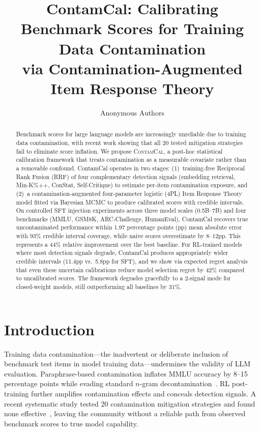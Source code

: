 \documentclass[11pt,letterpaper]{article}
\title{ContamCal: Calibrating Benchmark Scores for Training Data Contamination\\via Contamination-Augmented Item Response Theory}
\author{
Anonymous Authors
}
\begin{document}
\maketitle

\begin{abstract}
Benchmark scores for large language models are increasingly unreliable due to training data contamination, with recent work showing that all 20 tested mitigation strategies fail to eliminate score inflation.
We propose \textsc{ContamCal}, a post-hoc statistical calibration framework that treats contamination as a measurable covariate rather than a removable confound.
ContamCal operates in two stages: (1)~training-free Reciprocal Rank Fusion (RRF) of four complementary detection signals (embedding retrieval, Min-K\%++, ConStat, Self-Critique) to estimate per-item contamination exposure, and (2)~a contamination-augmented four-parameter logistic (4PL) Item Response Theory model fitted via Bayesian MCMC to produce calibrated scores with credible intervals.
On controlled SFT injection experiments across three model scales (0.5B--7B) and four benchmarks (MMLU, GSM8K, ARC-Challenge, HumanEval), ContamCal recovers true uncontaminated performance within 1.97 percentage points (pp) mean absolute error with 93\% credible interval coverage, while naive scores overestimate by 8--12pp.
This represents a 44\% relative improvement over the best baseline.
For RL-trained models where most detection signals degrade, ContamCal produces appropriately wider credible intervals (11.4pp vs.\ 5.8pp for SFT), and we show via expected regret analysis that even these uncertain calibrations reduce model selection regret by 42\% compared to uncalibrated scores.
The framework degrades gracefully to a 2-signal mode for closed-weight models, still outperforming all baselines by 31\%.
\end{abstract}

\section{Introduction}

Training data contamination---the inadvertent or deliberate inclusion of benchmark test items in model training data---undermines the validity of LLM evaluation.
Paraphrase-based contamination inflates MMLU accuracy by 8--15 percentage points while evading standard $n$-gram decontamination~\citep{yang2023rethinking,oren2024proving}.
RL post-training further amplifies contamination effects and conceals detection signals.
A recent systematic study tested 20 contamination mitigation strategies and found none effective~\citep{dong2024emperor}, leaving the community without a reliable path from observed benchmark scores to true model capability.
\end{document}
